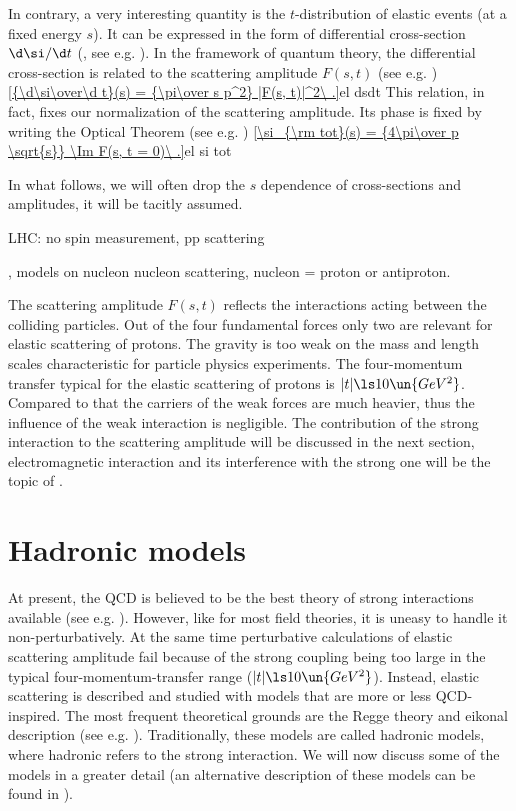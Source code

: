 In contrary, a very interesting quantity is the $t$-distribution of elastic events (at a fixed energy $s$). It can be expressed in the form of differential cross-section $\d\si/\d t$ (, see e.g. ). In the framework of quantum theory, the differential cross-section is related to the scattering amplitude $F(s, t)$ (see e.g. )
\eqref{{\d\si\over\d t}(s) = {\pi\over s p^2} |F(s, t)|^2\ .}{el dsdt}
This relation, in fact, fixes our normalization of the scattering amplitude. Its phase is fixed by writing the Optical Theorem (see e.g. )
\eqref{\si_{\rm tot}(s) = {4\pi\over p \sqrt{s}} \Im F(s, t = 0)\ .}{el si tot}

In what follows, we will often drop the $s$ dependence of cross-sections and amplitudes, it will be tacitly assumed.

\> LHC: no spin measurement, pp scattering


, models on nucleon nucleon scattering, nucleon = proton or antiproton.

\iffalse
cross-section def (norm)
si = |F|^2
Opt Theorem
crossing sym
(QCD - Chyla)

\bref{formanek QM}
\bref{formanek QFT}
\bref{peskin}
\bref{barone}
\fi


The scattering amplitude $F(s, t)$ reflects the interactions acting between the colliding particles. Out of the four fundamental forces only two are relevant for elastic scattering of protons. The gravity is too weak on the mass and length scales characteristic for particle physics experiments. The four-momentum transfer typical for the elastic scattering of protons is $|t| \ls 10\un{GeV^2}$. Compared to that the carriers of the weak forces are much heavier, thus the influence of the weak interaction is negligible. The contribution of the strong interaction to the scattering amplitude will be discussed in the next section, electromagnetic interaction and its interference with the strong one will be the topic of .

\section[el models]{Hadronic models}

At present, the QCD is believed to be the best theory of strong interactions available (see e.g. ). However, like for most field theories, it is uneasy to handle it non-perturbatively. At the same time perturbative calculations of elastic scattering amplitude fail because of the strong coupling being too large in the typical four-momentum-transfer range ($|t| \ls 10\un{GeV^2}$). Instead, elastic scattering is described and studied with models that are more or less QCD-inspired. The most frequent theoretical grounds are the Regge theory and eikonal description (see e.g. ). Traditionally, these models are called hadronic models, where hadronic refers to the strong interaction. We will now discuss some of the models in a greater detail (an alternative description of these models can be found in ).

